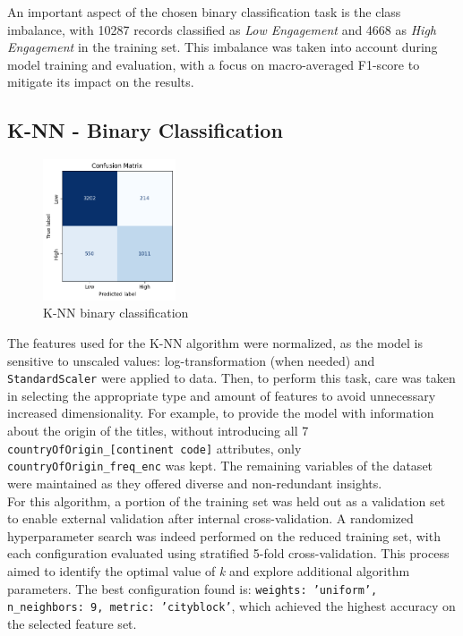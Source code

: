 An important aspect of the chosen binary classification task is the class imbalance, with 10287 records
classified as \textit{Low Engagement} and 4668 as \textit{High Engagement} in the training set.
This imbalance was taken into account during model training and evaluation, with a focus on
macro-averaged F1-score to mitigate its impact on the results.\\

\subsection{K-NN - Binary Classification}

\begin{figure}
    \centering
    \includegraphics[width=0.35\textwidth]{plots/knn_binary_confmatrix.png}
    \caption{K-NN binary classification}
    \label{fig:binary_knn_confusion_matrix}
\end{figure}
The features used for the K-NN algorithm were normalized, as the model is sensitive to unscaled values: log-transformation (when needed) and \texttt{StandardScaler} were applied to data. 
Then, to perform this task, care was taken in selecting the appropriate type and amount of features to avoid unnecessary increased dimensionality.
For example, to provide the model with information about the origin of the titles, without introducing all 7 \texttt{countryOfOrigin\_[continent code]} attributes, only \texttt{countryOfOrigin\_freq\_enc} was kept. 
The remaining variables of the dataset were maintained as they offered diverse and non-redundant insights.\\
For this algorithm, a portion of the training set was held out as a validation set to enable external validation after internal cross-validation. 
A randomized hyperparameter search was indeed performed on the reduced training set, with each configuration evaluated using stratified 5-fold cross-validation. 
This process aimed to identify the optimal value of \textit{k} and explore additional algorithm parameters. 
The best configuration found is: \texttt{weights: 'uniform', n\_neighbors: 9, metric: 'cityblock'}, which achieved the highest accuracy on the selected feature set.\\

